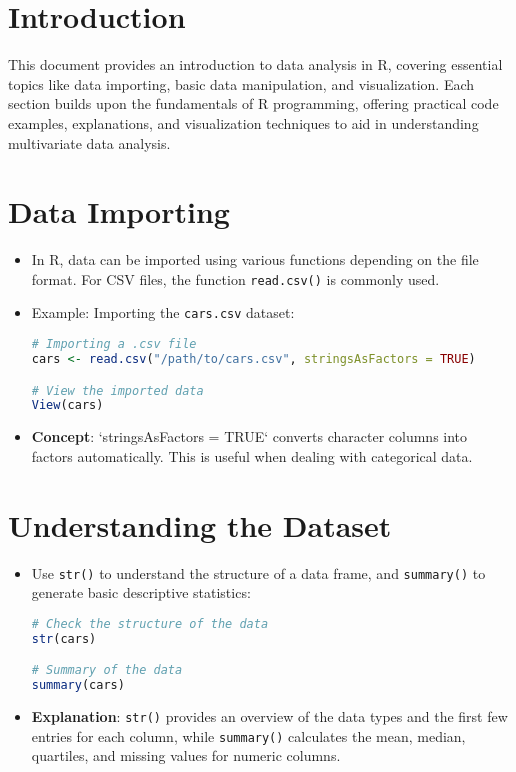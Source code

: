 \section{Introduction}
This document provides an introduction to data analysis in R, covering essential topics like data importing, basic data manipulation, and visualization. Each section builds upon the fundamentals of R programming, offering practical code examples, explanations, and visualization techniques to aid in understanding multivariate data analysis.

\section{Data Importing}
\begin{itemize}
    \item In R, data can be imported using various functions depending on the file format. For CSV files, the function \texttt{read.csv()} is commonly used.
    \item Example: Importing the \texttt{cars.csv} dataset:
\begin{lstlisting}[language=R]
# Importing a .csv file
cars <- read.csv("/path/to/cars.csv", stringsAsFactors = TRUE)

# View the imported data
View(cars)
\end{lstlisting}
    \item \textbf{Concept}: `stringsAsFactors = TRUE` converts character columns into factors automatically. This is useful when dealing with categorical data.
\end{itemize}

\section{Understanding the Dataset}
\begin{itemize}
    \item Use \texttt{str()} to understand the structure of a data frame, and \texttt{summary()} to generate basic descriptive statistics:
\begin{lstlisting}[language=R]
# Check the structure of the data
str(cars)

# Summary of the data
summary(cars)
\end{lstlisting}
    \item \textbf{Explanation}: \texttt{str()} provides an overview of the data types and the first few entries for each column, while \texttt{summary()} calculates the mean, median, quartiles, and missing values for numeric columns.
\end{itemize}


